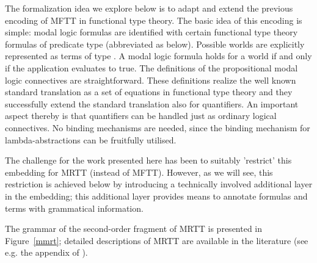 \begin{isabellebody}
\begin{isamarkuptext}
  The formalization idea we explore below is to adapt and extend the previous encoding of MFTT in 
  functional type theory. 
  The basic idea of this encoding is simple: modal logic formulas are identified with certain functional 
  type theory formulas of predicate type  (abbreviated as  below). 
  Possible worlds are explicitly represented as
  terms of type  . A modal logic formula \isa{{\isasymphi}} holds for a world  if and 
  only if the application  evaluates to true. The definitions of the propositional modal logic 
  connectives are straightforward. These definitions realize the well known standard translation as a set of equations 
  in functional type theory and they successfully extend the standard translation also for quantifiers. An important
  aspect thereby is that quantifiers can be handled just as ordinary logical connectives. No binding mechanisms are needed,
  since the binding mechanism for lambda-abstractions can be fruitfully utilised.
  
  The challenge for the work presented here has been to suitably 'restrict' this embedding for MRTT (instead of MFTT).
  However, as we will see, this restriction is achieved below by introducing a technically involved 
  additional layer in the embedding; this additional layer provides means to annotate formulas and terms with
  grammatical information.
 
  The grammar of the second-order fragment of MRTT is presented in Figure~\ref{mmrt}; detailed descriptions
  of MRTT are available in the literature (see e.g. the appendix of \cite{Zalta88}).
 

\end{isamarkuptext}
\end{isabellebody}

